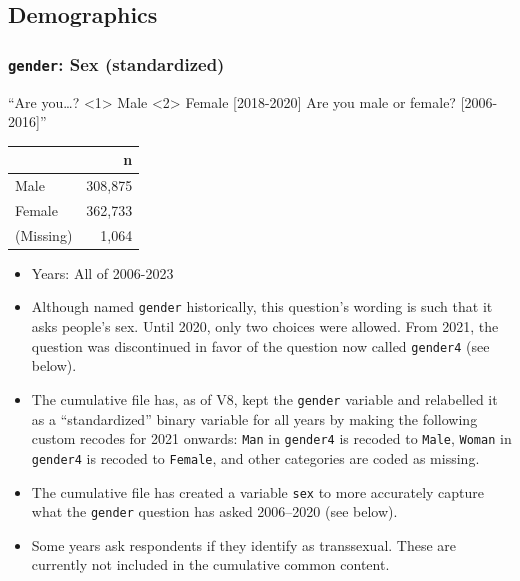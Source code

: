 \documentclass[10pt,article,oneside]{memoir}
\theoremstyle{definition}
\begin{document}
\subsection{Demographics}\label{demographics}

\subsubsection{\texorpdfstring{\texttt{gender}: Sex
(standardized)}{gender: Sex (standardized)}}\label{gender-sex-standardized}

``Are you\ldots? \textless1\textgreater{} Male \textless2\textgreater{}
Female {[}2018-2020{]} Are you male or female? {[}2006-2016{]}''

\begin{table}[H]
\centering
\begin{tabular}[t]{lr}
\toprule
 & n\\
\midrule
Male & 308,875\\
Female & 362,733\\
(Missing) & 1,064\\
\bottomrule
\end{tabular}
\end{table}

\begin{itemize}
\tightlist
\item
  Years: All of 2006-2023
\item
  Although named \texttt{gender} historically, this question's wording
  is such that it asks people's sex. Until 2020, only two choices were
  allowed. From 2021, the question was discontinued in favor of the
  question now called \texttt{gender4} (see below).
\item
  The cumulative file has, as of V8, kept the \texttt{gender} variable
  and relabelled it as a ``standardized'' binary variable for all years
  by making the following custom recodes for 2021 onwards: \texttt{Man}
  in \texttt{gender4} is recoded to \texttt{Male}, \texttt{Woman} in
  \texttt{gender4} is recoded to \texttt{Female}, and other categories
  are coded as missing.
\item
  The cumulative file has created a variable \texttt{sex} to more
  accurately capture what the \texttt{gender} question has asked
  2006--2020 (see below).
\item
  Some years ask respondents if they identify as transsexual. These are
  currently not included in the cumulative common content.
\end{itemize}
\end{document}
